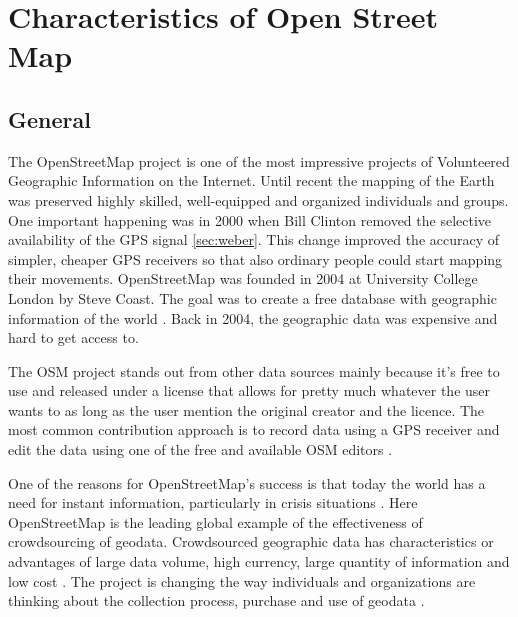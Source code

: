 \chapter{Characteristics of Open Street Map}

\section{General}
The OpenStreetMap project is one of the most impressive projects of Volunteered Geographic Information on the Internet\cite{Neis2012}. Until recent the mapping of the Earth was preserved highly skilled, well-equipped and organized individuals and groups. One important happening was in 2000 when Bill Clinton removed the selective availability of the GPS signal \ref{sec:weber}. This change improved the accuracy of simpler, cheaper GPS receivers so that also ordinary people could start mapping their movements. OpenStreetMap was founded in 2004 at University College London by Steve Coast. The goal was to create a free database with geographic information of the world \cite{Neis2012}. Back in 2004, the geographic data was expensive and hard to get access to. 

The OSM project stands out from other data sources mainly because it's free to use and released under a license that allows for pretty much whatever the user wants to as long as the user mention the original creator and the licence\cite{Chilton}.  The most common contribution approach is to record data using a GPS receiver and edit the data using one of the free and available OSM editors \cite{Neis2012}.  

One of the reasons for OpenStreetMap's success is that today the world has a need for instant information, particularly in crisis situations \cite{Chilton}. Here OpenStreetMap is the leading global example of the effectiveness of crowdsourcing of geodata. Crowdsourced geographic data has characteristics or advantages of large data volume, high currency, large quantity of information and low cost \cite{Wang2013}. The project is changing the way individuals and organizations are thinking about the collection process, purchase and use of geodata \cite{Chilton}.  


